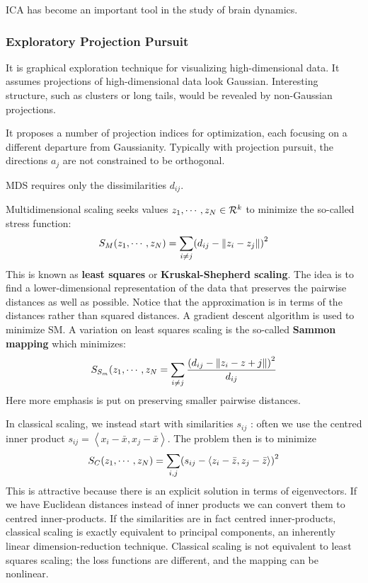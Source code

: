 \documentclass[12pt, letterpaper]{article}
\theoremstyle{definition}
\DeclarePairedDelimiter\autobracket{(}{)}
\newcommand{\br}[1]{\autobracket*{#1}}
\begin{document}
ICA has become an important tool in the study of brain dynamics.

\subsubsection{Exploratory Projection Pursuit}
It is graphical exploration technique for visualizing high-dimensional data. It assumes projections of high-dimensional data look Gaussian. Interesting structure, such as clusters or long tails, would be revealed by non-Gaussian projections.

It proposes a number of projection indices for optimization, each focusing on a different departure from Gaussianity. Typically with projection pursuit, the directions $a_j$ are not constrained to be orthogonal.

MDS requires only the dissimilarities $d_{ij}$.

Multidimensional scaling seeks values $z_1, \cdots , z_N \in \CMcal{R}^k$ to minimize the so-called stress function:
\begin{equation}
S_M(z_1, \cdots, z_N) = \sum_{i\ne j}\br{d_{ij}- \| z_i - z_j \|}^2
\end{equation}
This is known as \textbf{least squares} or \textbf{Kruskal-Shepherd scaling}. The idea is to find a lower-dimensional representation of the data that preserves the pairwise distances as well as possible. Notice that the approximation is in terms of the distances rather than squared distances. A gradient descent algorithm is used to minimize SM.
A variation on least squares scaling is the so-called \textbf{Sammon mapping} which minimizes:
\begin{equation}
S_{S_m}(z_1, \cdots, z_N = \sum_{i\ne j}\frac{\br{d_{ij} - \|z_i - z+j\|}^2}{d_{ij}}
\end{equation}
Here more emphasis is put on preserving smaller pairwise distances.

In classical scaling, we instead start with similarities $s_{ij}$ : often we use the centred inner product $s_{ij} = \left\langle x_i - \bar{x} , x_j - \bar{x}\right\rangle$. The problem then is to minimize
\begin{equation}
S_C(z_1, \cdots, z_N) = \sum_{i,j} \br{s_{ij} - \left\langle z_i-\bar{z}, z_j - \bar{z}\right\rangle}^2
\end{equation}
This is attractive because there is an explicit solution in terms of eigenvectors. If we have Euclidean distances instead of inner products we can convert them to centred inner-products. If the similarities are in fact centred inner-products, classical scaling is exactly equivalent to principal components, an inherently linear dimension-reduction technique. Classical scaling is not equivalent to least squares scaling; the loss functions are different, and the mapping can be nonlinear.
\end{document}
